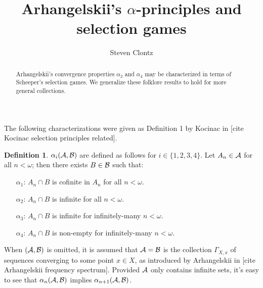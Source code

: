 \documentclass{amsart}
\theoremstyle{plain}
\theoremstyle{definition}
\newtheorem{definition}[theorem]{Definition}
\theoremstyle{remark}
\theoremstyle{plain}
\theoremstyle{definition}
\theoremstyle{remark}
\begin{document}
\title{Arhangelskii's \(\alpha\)-principles and selection games}



\author{Steven Clontz}
\address{Department of Mathematics and Statistics,
The University of South Alabama,
Mobile, AL 36688}







\begin{abstract}
Arhangelskii's convergence properties \(\alpha_2\) and \(\alpha_4\)
may be characterized in terms of Scheeper's selection games.
We generalize these folklore results to hold for more general collections.
\end{abstract}


\maketitle



The following characterizations were given as Definition 1 by Kocinac in
[cite Kocinac selection principles related].

\begin{definition}
 \(\alpha_i(\mathcal{A},\mathcal{B})\) are defined as follows
for \(i\in\{1,2,3,4\}\).
Let \(A_n\in\mathcal{A}\) for all \(n<\omega\); then there exists \(B\in\mathcal{B}\) such that:
\begin{itemize}
\item[\(\alpha_1\):] \(A_n\cap B\) is cofinite in \(A_n\) for all \(n<\omega\).
\item[\(\alpha_2\):] \(A_n\cap B\) is infinite for all \(n<\omega\).
\item[\(\alpha_3\):] \(A_n\cap B\) is infinite for infinitely-many \(n<\omega\).
\item[\(\alpha_4\):] \(A_n\cap B\) is non-empty for infinitely-many \(n<\omega\).
\end{itemize}
\end{definition}

When \((\mathcal{A},\mathcal{B})\) is omitted, it is assumed that \(\mathcal{A}=\mathcal{B}\) is the
collection \(\Gamma_{X,x}\) of sequences converging to some point \(x\in X\),
as introduced by Arhangelskii in [cite Arhangelskii frequency spectrum].
Provided \(\mathcal{A}\) only contains infinite sets, it's easy to see that
\(\alpha_n(\mathcal{A},\mathcal{B})\) implies \(\alpha_{n+1}(\mathcal{A},\mathcal{B})\).
\end{document}
